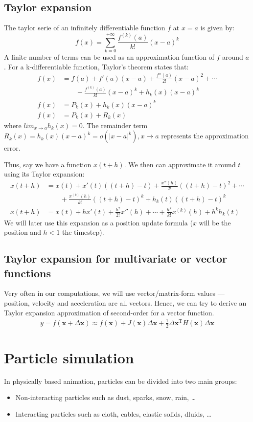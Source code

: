 \documentclass{article}
\begin{document}
\subsection{Taylor expansion}
The taylor serie of an infinitely differentiable function $f$ at $x=a$ is given by:
\[
f(x) = \sum_{k=0}^{+\infty} \frac{f^{(k)}(a)}{k!}(x-a)^k
\]
A finite number of terms can be used as an approximation function of $f$ around $a$.
For a k-differentiable function, Taylor's theorem states that:
\begin{align*}
    f(x) &= f(a) + f'(a)(x-a) + \frac{f''(a)}{2!}(x-a)^2 + \cdots \\ &\qquad {} +\frac{f^{(k)}(a)}{k!}(x-a)^k + h_k(x)(x-a)^k \\
    f(x) &= P_k(x) + h_k(x)(x-a)^k \\
    f(x) &= P_k(x) + R_k(x)
\end{align*} where $lim_{x\to a}h_k(x)=0$. \newline
The remainder term $R_k(x) = h_k(x)(x-a)^k = o(|x-a|^k),  x \longrightarrow a$ represents the approximation error.

Thus, say we have a function $x(t+h)$. We then can approximate it around $t$ using its Taylor expansion:
\begin{align*}
    x(t+h) &= x(t) + x'(t)((t+h)-t) + \frac{x''(h)}{2!}((t+h)-t)^2 + \cdots \\ &\qquad {} +\frac{x^{(k)}(h)}{k!}((t+h)-t)^k + h_k(t)((t+h)-t)^k \\
    x(t+h) &= x(t) + h x'(t) + \frac{h^2}{2!}x''(h)+ \cdots + \frac{h^k}{k!}x^{(k)}(h) +  h^k h_k(t) 
\end{align*}
We will later use this expansion as a position update formula ($x$ will be the position and $h<1$ the timestep).

\subsection{Taylor expansion for multivariate or vector functions} 
Very often in our computations, we will use vector/matrix-form values --- position, velocity and acceleration are all vectors.
Hence, we can try to derive an Taylor expansion approximation of second-order for a vector function.
\begin{align}
    y=f(\mathbf{x}+\Delta\mathbf{x})\approx f(\mathbf{x}) + J(\mathbf{x})\Delta \mathbf{x} +\frac{1}{2} \Delta\mathbf{x}^\mathrm{T} H(\mathbf{x}) \Delta\mathbf{x}
\end{align}
\section{Particle simulation}
In physically based animation, particles can be divided into two main groups:
\begin{itemize}
\item Non-interacting particles such as dust, sparks, snow, rain, \ldots 
\item Interacting particles such as cloth, cables, elastic solids, dluids, \ldots 
\end{itemize}
\end{document}
